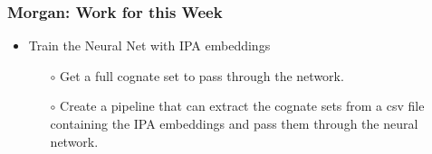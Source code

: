 \documentclass[a4paper, 14pt]{article}
\begin{document}
\begin{frame}
    \frametitle{Morgan: Work for this Week}
    \begin{itemize}
    \itemsep-2em
        \item Train the Neural Net with IPA embeddings
        \begin{itemize}
        \itemsep-2em
            \item[$\circ$] Get a full cognate set to pass through the network.
             \item[$\circ$] Create a pipeline that can extract the cognate sets from a csv file containing the IPA embeddings and pass them through the neural network. 
        \end{itemize}
    \end{itemize}

    
\end{frame}
\end{document}
